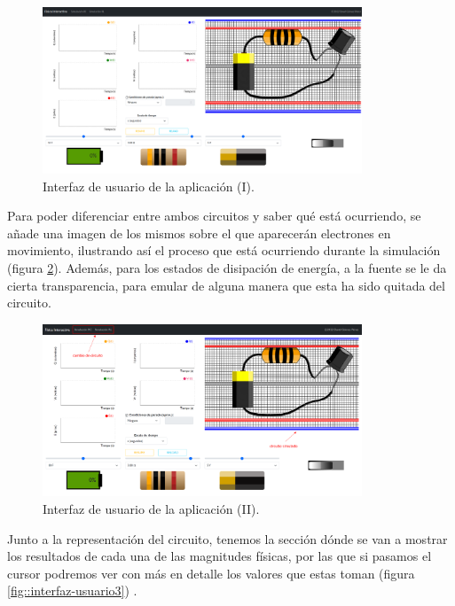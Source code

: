 \documentclass[../main.tex]{subfiles}
\begin{document}
\begin{figure}[!ht]
  \centering
  \includegraphics[width=0.85\textwidth]{images/interfaz-usuario.png}
  \caption{Interfaz de usuario de la aplicación (I).}
  \label{fig::interfaz-usuario}
\end{figure}


Para poder diferenciar entre ambos circuitos y saber qué está ocurriendo, se añade una imagen de los mismos sobre el que aparecerán electrones en movimiento, ilustrando así el proceso que está ocurriendo durante la simulación (figura \ref{fig::interfaz-usuario2}). Además, para los estados de disipación de energía, a la fuente se le da cierta transparencia, para emular de alguna manera que esta ha sido quitada del circuito. \\

\begin{figure}[!ht]
  \centering
  \includegraphics[width=0.85\textwidth]{images/circuito-simulado.png}
  \caption{Interfaz de usuario de la aplicación (II).}
  \label{fig::interfaz-usuario2}
\end{figure}

Junto a la representación del circuito, tenemos la sección dónde se van a mostrar los resultados de cada una de las magnitudes físicas, por las que si pasamos el cursor podremos ver con más en detalle los valores que estas toman (figura \ref{fig::interfaz-usuario3}) .\\
\end{document}
